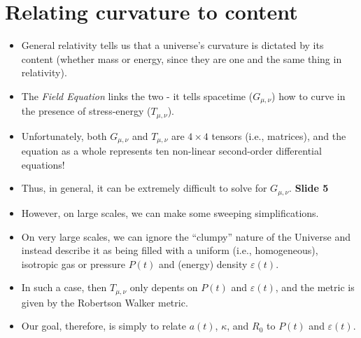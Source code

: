 \documentclass[11pt]{article}
\begin{document}
\section{Relating curvature to content}
\begin{itemize}
\item General relativity tells us that a universe's curvature is dictated by its content (whether mass or energy, since they are one and the same thing in relativity).
\item The {\it Field Equation} links the two - it tells spacetime ($G_{\mu,\nu}$) how to curve in the presence of stress-energy ($T_{\mu, \nu}$).
\item Unfortunately, both $G_{\mu,\nu}$ and $T_{\mu, \nu}$ are $4\times4$ tensors (i.e., matrices), and the equation as a whole represents ten non-linear second-order differential equations!
\item Thus, in general, it can be extremely difficult to solve for $G_{\mu,\nu}$.
{\bf Slide 5}
\item However, on large scales, we can make some sweeping simplifications.
\item On very large scales, we can ignore the ``clumpy'' nature of the Universe and instead describe it as being filled with a uniform (i.e., homogeneous), isotropic gas or pressure $P(t)$ and (energy) density $\varepsilon(t)$.
\item In such a case, then $T_{\mu,\nu}$ only depents on $P(t)$ and $\varepsilon(t)$, and the metric is given by the Robertson Walker metric.
\item Our goal, therefore, is simply to relate $a(t)$, $\kappa$, and $R_0$ to $P(t)$ and $\varepsilon(t)$.
\end{itemize}
\end{document}
